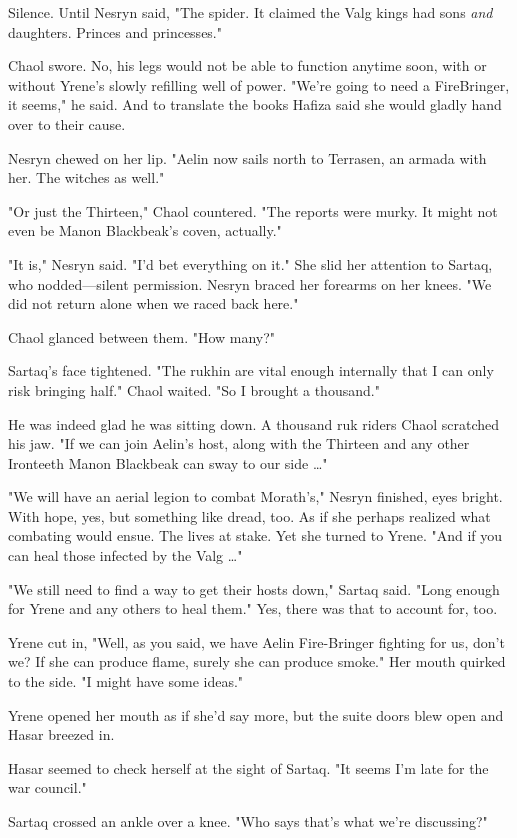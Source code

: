 Silence. Until Nesryn said, "The spider. It claimed the Valg kings had sons \emph{and} daughters. Princes and princesses."

Chaol swore. No, his legs would not be able to function anytime soon, with or without Yrene's slowly refilling well of power. "We're going to need a FireBringer, it seems," he said. And to translate the books Hafiza said she would gladly hand over to their cause.

Nesryn chewed on her lip. "Aelin now sails north to Terrasen, an armada with her. The witches as well."

"Or just the Thirteen," Chaol countered. "The reports were murky. It might not even be Manon Blackbeak's coven, actually."

"It is," Nesryn said. "I'd bet everything on it." She slid her attention to Sartaq, who nodded---silent permission. Nesryn braced her forearms on her knees. "We did not return alone when we raced back here."

Chaol glanced between them. "How many?"

Sartaq's face tightened. "The rukhin are vital enough internally that I can only risk bringing half." Chaol waited. "So I brought a thousand."

He was indeed glad he was sitting down. A thousand ruk riders 
Chaol scratched his jaw. "If we can join Aelin's host, along with the Thirteen and any other Ironteeth Manon Blackbeak can sway to our side
\ldots"

"We will have an aerial legion to combat Morath's," Nesryn finished, eyes bright. With hope, yes, but something like dread, too. As if she perhaps realized what combating would ensue. The lives at stake. Yet she turned to Yrene. "And if you can heal those infected by the Valg
\ldots"

"We still need to find a way to get their hosts down," Sartaq said. "Long enough for Yrene and any others to heal them." Yes, there was that to account for, too.

Yrene cut in, "Well, as you said, we have Aelin Fire-Bringer fighting for us, don't we? If she can produce flame, surely she can produce smoke." Her mouth quirked to the side. "I might have some ideas."

Yrene opened her mouth as if she'd say more, but the suite doors blew open and Hasar breezed in.

Hasar seemed to check herself at the sight of Sartaq. "It seems I'm late for the war council."

Sartaq crossed an ankle over a knee. "Who says that's what we're discussing?"

